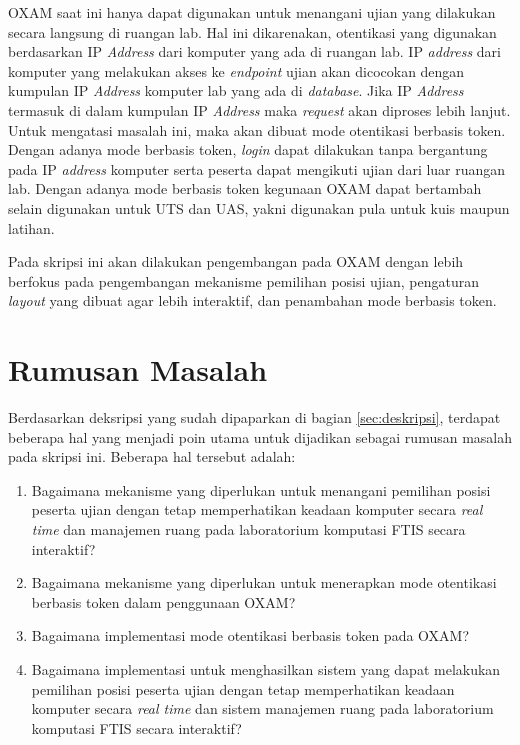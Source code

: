 \documentclass[a4paper,twoside]{article}
\begin{document}
OXAM saat ini hanya dapat digunakan untuk menangani ujian yang dilakukan secara langsung di ruangan lab. Hal ini dikarenakan, otentikasi yang digunakan berdasarkan IP \textit{Address} dari komputer yang ada di ruangan lab. IP \textit{address} dari komputer yang melakukan akses ke \textit{endpoint} ujian akan dicocokan dengan kumpulan IP \textit{Address} komputer lab yang ada di \textit{database}. Jika IP \textit{Address} termasuk di dalam kumpulan IP \textit{Address} maka \textit{request} akan diproses lebih lanjut. Untuk mengatasi masalah ini, maka akan dibuat mode otentikasi berbasis token. Dengan adanya mode berbasis token, \textit{login} dapat dilakukan tanpa bergantung pada IP \textit{address} komputer serta peserta dapat mengikuti ujian dari luar ruangan lab. Dengan adanya mode berbasis token kegunaan OXAM dapat bertambah selain digunakan untuk UTS dan UAS, yakni digunakan pula untuk kuis maupun latihan. 

Pada skripsi ini akan dilakukan pengembangan pada OXAM dengan lebih berfokus pada pengembangan mekanisme pemilihan posisi ujian, pengaturan \textit{layout} yang dibuat agar lebih interaktif, dan penambahan mode berbasis token. 

\newpage

\section{Rumusan Masalah}
\label{sec:rumusan}

Berdasarkan deksripsi yang sudah dipaparkan di bagian \ref{sec:deskripsi}, terdapat beberapa hal yang menjadi poin utama untuk dijadikan sebagai rumusan masalah pada skripsi ini. Beberapa hal tersebut adalah:
\begin{enumerate}
    \item Bagaimana mekanisme yang diperlukan untuk menangani pemilihan posisi peserta ujian dengan tetap memperhatikan keadaan komputer secara \textit{real time} dan manajemen ruang pada laboratorium komputasi FTIS secara interaktif?
    \item Bagaimana mekanisme yang diperlukan untuk menerapkan mode otentikasi berbasis token dalam penggunaan OXAM?
    \item Bagaimana implementasi mode otentikasi berbasis token pada OXAM?
    \item Bagaimana implementasi untuk menghasilkan sistem yang dapat melakukan pemilihan posisi peserta ujian dengan tetap memperhatikan keadaan komputer secara \textit{real time} dan sistem manajemen ruang pada laboratorium komputasi FTIS secara interaktif?
\end{enumerate}
\end{document}
